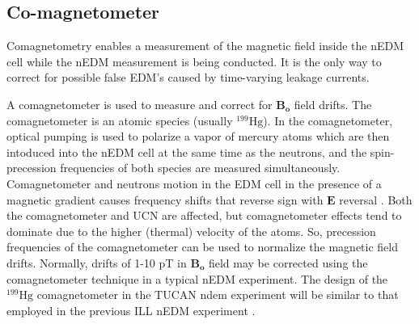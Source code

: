 \FloatBarrier






\subsection{Co-magnetometer}
Comagnetometry enables a measurement of the magnetic field inside the nEDM cell while the nEDM measurement is being conducted. It is the only way to correct for possible false EDM's caused by time-varying leakage currents. 

A comagnetometer is used to measure and correct for  $\bm{B_o}$ field drifts. The comagnetometer is an atomic species (usually $^{199}\text{Hg}$). In the comagnetometer, optical pumping is used to polarize a vapor of mercury atoms  which are then intoduced into the
nEDM cell at the same time as the neutrons, and the spin-precession frequencies of both species are measured simultaneously. Comagnetometer and neutrons motion in the EDM cell in the presence of a magnetic gradient causes frequency shifts that reverse sign with $\bm{E}$ reversal \cite{comag_1,comag_2,comag_3}. Both the comagnetometer and UCN are affected, but comagnetometer effects tend to dominate due to the higher (thermal) velocity of the atoms. So, precession frequencies of the comagnetometer can be used to normalize the magnetic field drifts. Normally, drifts of 1-10 pT in $\bm{B_o}$ field may be corrected using the comagnetometer technique in a typical nEDM experiment. The design of the $^{199}\mathrm{Hg}$ comagnetometer in the TUCAN ndem experiment will be similar to that employed in the previous ILL nEDM experiment \cite{bestLim_1,comag_4}.


